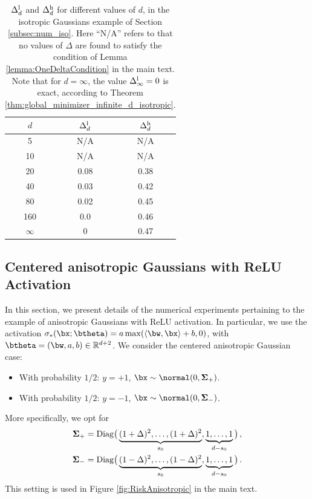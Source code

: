 \documentclass[11pt]{article}
\begin{document}
\begin{table}
	\centering	
	\begin{tabular}{|c|c|c|}	
		\hline
		$d$ & $\Delta_d^{\rm l}$ & $\Delta_d^{\rm h}$ \\
		\hline \hline
		5 & N/A & N/A \\
		10 & N/A & N/A \\
		20 & 0.08 & 0.38 \\
		40 & 0.03 &0.42 \\
		80 &  0.02 & 0.45 \\
		160 & 0.0 & 0.46 \\
		$\infty$ & 0 & 0.47 \\
		\hline
	\end{tabular}
	\caption{$\Delta_d^{\rm l}$ and $\Delta_d^{\rm h}$ for different values of $d$, in the isotropic Gaussians example of Section \ref{subsec:num_iso}. Here ``N/A'' refers to that no values of $\Delta$ are found to satisfy the condition of
 Lemma \ref{lemma:OneDeltaCondition} in the main text. Note that for $d=\infty$, the value $\Delta_\infty^{\rm l}=0$ is exact, according to Theorem \ref{thm:global_minimizer_infinite_d_isotropic}.}
	\label{tab:num_iso_Deltad}
\end{table}

\subsection{Centered anisotropic Gaussians with ReLU Activation}\label{subsec:num_ani}

In this section, we present details of the numerical experiments pertaining to the example of anisotropic Gaussians with ReLU activation. In particular, we use the activation $\sigma_*(\bx;\btheta) = a\max(\langle\bw,\bx\rangle + b, 0)$, with $\btheta = (\bw, a, b)\in\mathbb{R}^{d+2}$. We consider the centered anisotropic Gaussian case:
\begin{itemize}	
	\item[] With probability $1/2$: $y=+1$, $\bx\sim\normal(0,\mathbf{\Sigma}_+)$.
	\item[] With probability $1/2$: $y=-1$, $\bx\sim\normal(0,\mathbf{\Sigma}_-)$.	
\end{itemize}
More specifically, we opt for
\begin{align}
\mathbf{\Sigma}_+ &={\rm Diag}\big(\underbrace{(1+\Delta)^2,\dots,(1+\Delta)^2}_{s_0},\underbrace{1,\dots,1}_{d-s_0}\big)\, ,\\
\mathbf{\Sigma}_- &={\rm Diag}\big(\underbrace{(1-\Delta)^2,\dots,(1-\Delta)^2}_{s_0},\underbrace{1,\dots,1}_{d-s_0}\big)\, .
\end{align}
This setting is used in Figure \ref{fig:RiskAnisotropic} in the main text.
\end{document}
